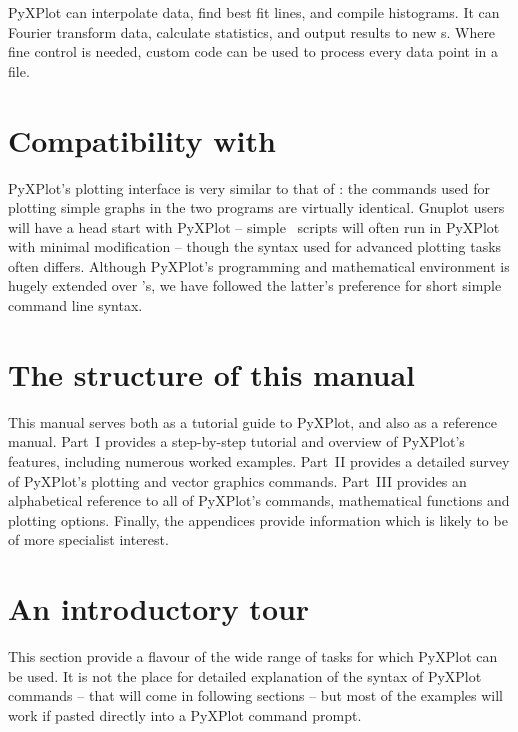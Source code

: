 
PyXPlot can interpolate data, find best fit lines, and compile histograms. It
can Fourier transform data, calculate statistics, and output results to new
\datafile s. Where fine control is needed, custom code can be used to process
every data point in a file.

\section{Compatibility with \gnuplot}

PyXPlot's plotting interface is very similar to that of \gnuplot: the commands
used for plotting simple graphs in the two programs are virtually identical.
Gnuplot users will have a head start with PyXPlot -- simple \gnuplot\ scripts
will often run in PyXPlot with minimal modification -- though the syntax used
for advanced plotting tasks often differs. Although PyXPlot's programming and
mathematical environment is hugely extended over \gnuplot's, we have followed
the latter's preference for short simple command line syntax.

\section{The structure of this manual}

This manual serves both as a tutorial guide to PyXPlot, and also as a reference
manual. Part~I provides a step-by-step tutorial and overview of PyXPlot's
features, including numerous worked examples. Part~II provides a detailed
survey of PyXPlot's plotting and vector graphics commands. Part~III provides an
alphabetical reference to all of PyXPlot's commands, mathematical functions and
plotting options.  Finally, the appendices provide information which is likely
to be of more specialist interest.

\section{An introductory tour}

This section provide a flavour of the wide range of tasks for which PyXPlot can
be used. It is not the place for detailed explanation of the syntax of PyXPlot
commands -- that will come in following sections -- but most of the examples
will work if pasted directly into a PyXPlot command prompt.


